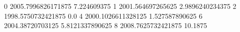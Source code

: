 0 2005.7996826171875 7.224609375
1 2001.564697265625 2.9896240234375
2 1998.5750732421875 0.0
4 2000.1026611328125 1.527587890625
6 2004.38720703125 5.8121337890625
8 2008.7625732421875 10.1875
